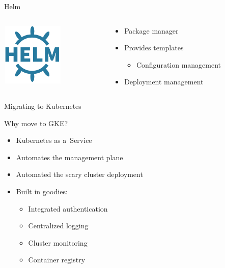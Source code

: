 \documentclass[17pt]{beamer}
\newcommand{\imageframe}[2]{{
  \usebackgroundtemplate{\texttt{[image: \#1]}}
  \begin{frame}{
    \vspace{-6pt}\usebeamercolor[fg]{item}
    \pgfsetfillopacity{0.8}
    \begin{snugshade}
    \centering #2
    \end{snugshade}
  }
  \end{frame}
}}
\begin{document}
  \begin{frame}{Helm}
    \begin{columns}[c]
      \begin{column}{.2\textwidth}
          \includegraphics[width=3cm,height=3cm]{images/helm_logo.png}
      \end{column}
      \begin{column}{.8\textwidth}
        \begin{itemize}
          \item Package manager
          \item Provides templates
          \begin{itemize}
            \item Configuration management
          \end{itemize}
          \item Deployment management
        \end{itemize}
      \end{column}
    \end{columns}
  \end{frame}


  \imageframe{images/migrating_cranes.jpg}{Migrating to Kubernetes}

  \begin{frame}{Why move to GKE?}
  \begin{itemize}
    \item<1-> Kubernetes as a~Service
    \item<2-> Automates the management plane
    \item<3-> Automated the scary cluster deployment
    \item<4-> Built in goodies:
    \begin{itemize}
      \item Integrated authentication
      \item Centralized logging
      \item Cluster monitoring
      \item Container registry
    \end{itemize}
  \end{itemize}
  \end{frame}
\end{document}
